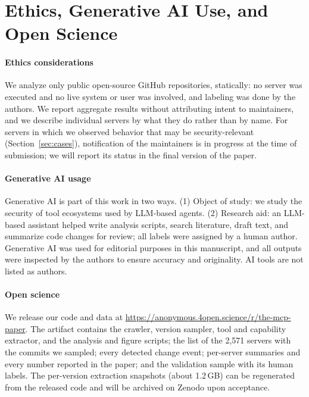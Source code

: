\section{Ethics, Generative AI Use, and Open Science}\label{sec:appendix}

\paragraph{Ethics considerations}
We analyze only public open-source GitHub repositories, statically: no server was executed and no live system or user was involved, and labeling was done by the authors. We report aggregate results without attributing intent to maintainers, and we describe individual servers by what they do rather than by name. For servers in which we observed behavior that may be security-relevant (Section~\ref{sec:cases}), notification of the maintainers is in progress at the time of submission; we will report its status in the final version of the paper.

\paragraph{Generative AI usage}
Generative AI is part of this work in two ways. (1) Object of study: we study the security of tool ecosystems used by LLM-based agents. (2) Research aid: an LLM-based assistant helped write analysis scripts, search literature, draft text, and summarize code changes for review; all labels were assigned by a human author. Generative AI was used for editorial purposes in this manuscript, and all outputs were inspected by the authors to ensure accuracy and originality. AI tools are not listed as authors.

\paragraph{Open science}
We release our code and data at \url{https://anonymous.4open.science/r/the-mcp-paper}. The artifact contains the crawler, version sampler, tool and capability extractor, and the analysis and figure scripts; the list of the 2,571 servers with the commits we sampled; every detected change event; per-server summaries and every number reported in the paper; and the validation sample with its human labels. The per-version extraction snapshots (about 1.2\,GB) can be regenerated from the released code and will be archived on Zenodo upon acceptance.
